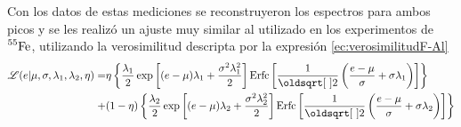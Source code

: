 Con los datos de estas mediciones se reconstruyeron los espectros para ambos picos y se les realizó un ajuste muy similar al utilizado en los experimentos de $\prescript{55}{}{\mbox{Fe}}$, utilizando la verosimilitud descripta por la expresión \eqref{ec:verosimilitudF-Al}
\begin{align}
    \Lagr(e|\mu,
            \sigma,
            \lambda_{1},
            \lambda_{2},
            \eta)
    = &
    \eta
    \left\{
        \frac{\lambda_{1}}{2}
        \exp\left[
                (e-\mu)\lambda_{1} + \frac{\sigma^{2}\lambda_{1}^{2}}{2}
            \right]
        \mbox{Erfc}
        \left[
            \frac{1}{\sqrt{2}}
            \left(
                \frac{e - \mu}{\sigma}
                +\sigma\lambda_{1}
            \right)
        \right] \right\} \nonumber
        \\
        + &
        (1-\eta)
        \left\{
        \frac{\lambda_{2}}{2}
        \exp
            \left[
                 (e - \mu)\lambda_{2}
                 + \frac{\sigma^{2}\lambda_{2}^{2}}{2}
            \right]
        \mbox{Erfc}
        \left[
            \frac{1}{\sqrt{2}}
            \left(
                \frac{e - \mu}{\sigma}
                +\sigma\lambda_{2}
            \right)
        \right]
    \right\}
        \label{ec:verosimilitudF-Al}
\end{align}


